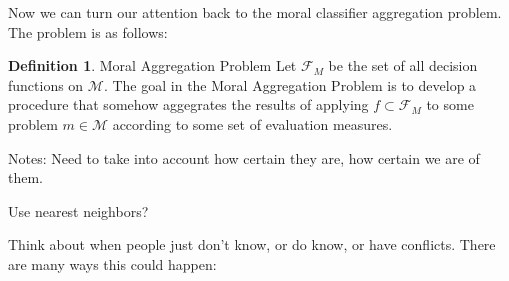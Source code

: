 \documentclass[11pt]{article}
\theoremstyle{definition}
\newtheorem{definition}{Definition}[section]
\newcommand{\M}{\mathcal{M}}
\begin{document}
Now we can turn our attention back to the moral classifier aggregation problem. The problem is as follows: 

\theoremstyle{definition}
\begin{definition}{Moral Aggregation Problem}
Let $\mathcal{F}_M$ be the set of all decision functions on $\M$. The goal in the Moral Aggregation Problem is to develop a procedure that somehow aggegrates the results of applying $f \subset \mathcal{F}_M$ to some problem $m \in \M$ according to some set of evaluation measures.
\end{definition}
Notes:
Need to take into account how certain they are, how certain we are of them.

Use nearest neighbors?

Think about when people just don't know, or do know, or have conflicts. 
There are many ways this could happen:
\end{document}
